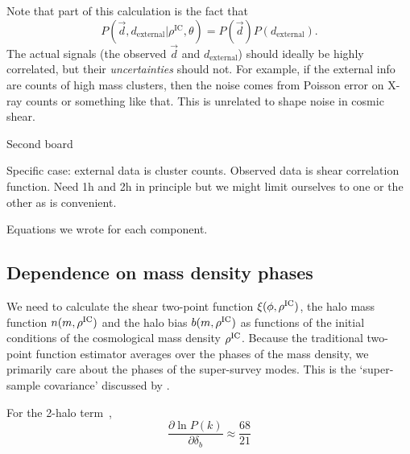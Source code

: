 \documentclass[preprint]{aastex}
\newcommand{\beq}{\begin{equation}}
\newcommand{\eeq}{\end{equation}}
\newcommand{\skyangle}{\phi}
\newcommand{\rhoic}{\rho^{\rm IC}}
\begin{document}
Note that part of this calculation is the fact that
\beq
P(\vec{d},d_\text{external}|\rho^\text{IC},\theta) = P(\vec{d})P(d_\text{external}).
\eeq
The actual signals (the observed $\vec{d}$ and $d_\text{external}$) should ideally be highly
correlated, but their {\em uncertainties} should not.  For example, if the external info are counts
of high mass clusters, then the noise comes from Poisson error on X-ray counts or something like
that.  This is unrelated to shape noise in cosmic shear.


Second board

Specific case: external data is cluster counts.  Observed data is shear correlation function.  Need
1h and 2h in principle but we might limit ourselves to one or the other as is convenient.

Equations we wrote for each component.


\subsection{Dependence on mass density phases} %
\label{sub:dependence_on_mass_density_phases}
We need to calculate the shear two-point function $\xi(\skyangle, \rhoic)$, 
the halo mass function $n(m, \rhoic)$
and the halo bias $b(m, \rhoic)$ as functions of the initial conditions of the 
cosmological mass density $\rhoic$. 
Because the traditional two-point function estimator averages over the phases 
of the mass density, we primarily care about the phases of the super-survey 
modes. This is the `super-sample covariance' discussed by 
\citet{takada2013}.

For the 2-halo term~\citep[eq. 39 of][]{takada2013}, 
\begin{equation}
	\frac{\partial \ln P(k)}{\partial \delta_b} \approx 
	\frac{68}{21}
\end{equation}




\end{document}
